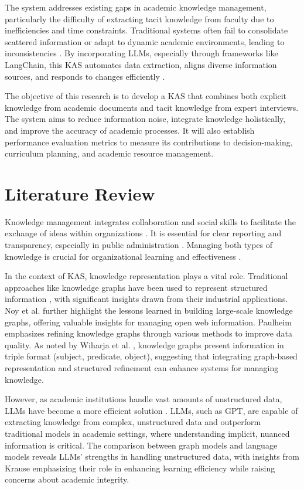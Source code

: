 \documentclass[runningheads]{llncs}
\begin{document}
The system addresses existing gaps in academic knowledge management, particularly the difficulty of extracting tacit knowledge from faculty due to inefficiencies and time constraints. Traditional systems often fail to consolidate scattered information or adapt to dynamic academic environments, leading to inconsistencies \cite{kiran2019}. By incorporating LLMs, especially through frameworks like LangChain, this KAS automates data extraction, aligns diverse information sources, and responds to changes efficiently \cite{deepLearning2023LangChain}.

The objective of this research is to develop a KAS that combines both explicit knowledge from academic documents and tacit knowledge from expert interviews. The system aims to reduce information noise, integrate knowledge holistically, and improve the accuracy of academic processes. It will also establish performance evaluation metrics to measure its contributions to decision-making, curriculum planning, and academic resource management.

\section{Literature Review}
Knowledge management integrates collaboration and social skills to facilitate the exchange of ideas within organizations \cite{Gao2021}. It is essential for clear reporting and transparency, especially in public administration \cite{Bem2022}. Managing both types of knowledge is crucial for organizational learning and effectiveness \cite{vincent2022}.

In the context of KAS, knowledge representation plays a vital role. Traditional approaches like knowledge graphs have been used to represent structured information \cite{Hogan2021}, with significant insights drawn from their industrial applications. Noy et al. \cite{Noy2019} further highlight the lessons learned in building large-scale knowledge graphs, offering valuable insights for managing open web information. Paulheim \cite{Paulheim2017} emphasizes refining knowledge graphs through various methods to improve data quality. As noted by Wiharja et al. \cite{wiharja2020iterative}, knowledge graphs present information in triple format (subject, predicate, object), suggesting that integrating graph-based representation and structured refinement can enhance systems for managing knowledge.

However, as academic institutions handle vast amounts of unstructured data, LLMs have become a more efficient solution \cite{Brown2020}. LLMs, such as GPT, are capable of extracting knowledge from complex, unstructured data and outperform traditional models in academic settings, where understanding implicit, nuanced information is critical.  The comparison between graph models and language models reveals LLMs' strengths in handling unstructured data, with insights from Krause \cite{Krause2024} emphasizing their role in enhancing learning efficiency while raising concerns about academic integrity.
\end{document}
